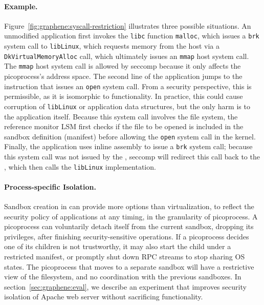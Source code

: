 \paragraph{Example.}
Figure~\ref{fig:graphene:syscall-restriction} illustrates three possible situations. 
An unmodified application first invokes the {\tt libc} function {\tt malloc}, which issues 
a {\tt brk} system call to {\tt libLinux}, which requests memory 
from the host via a {\tt Dk\-Virtual\-Memory\-Alloc} \pal{} call,
which ultimately issues an {\tt mmap} host system call.
The {\tt mmap} host system call is allowed by seccomp because it only 
affects the picoprocess's address space.
The second line of the application jumps to the \pal{} instruction that issues
an {\tt open} system call.
From a security perspective, this is permissible,
as it is isomorphic to \pal{} functionality.
In practice, this could cause
corruption of {\tt libLinux} or application data structures,
but the only harm is to the application itself. 
Because this system call involves the file system, the reference monitor LSM first checks if the file to be opened is included in the sandbox definition (manifest) before allowing  the {\tt open} system call in the kernel.  
Finally, the application uses inline assembly to issue a {\tt brk} system call;
because this system call was not issued by the \pal{},
seccomp will redirect this call back to the \pal{},
which then calls the {\tt libLinux} implementation.

\paragraph{Process-specific Isolation.} 
Sandbox creation in \graphene{} can provide
more options than virtualization, to reflect the security policy of applications at any timing,
in the granularity of picoprocess. 
A picoprocess can voluntarily detach itself from the current sandbox, dropping its privileges,
after finishing security-sensitive operations.
If a picoprocess decides one of its children is not trustworthy, it may also start the child under a restricted manifest,
or promptly shut down RPC streams to stop sharing OS states.
The picoprocess that moves to a separate sandbox will have a restrictive view of the filesystem, and no coordination with the previous sandboxes.
In section~\ref{sec:graphene:eval}, we describe an experiment that improves security isolation of Apache web server without sacrificing functionality.


